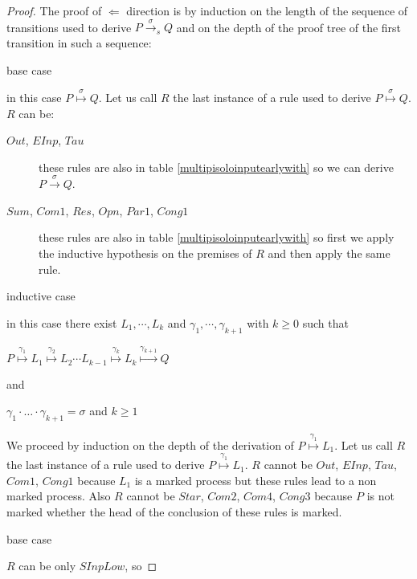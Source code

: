 \begin{proposition}
\begin{proof}
    
    The proof of $\Leftarrow$ direction is by induction on the length of the sequence of transitions used to derive $P\xrightarrow{\sigma}_{s} Q$ and on the depth of the proof tree of the first transition in such a sequence:
    \begin{description}
      \item[base case]
    \end{description}
	in this case $P\stackrel{\sigma}{\longmapsto} Q$. Let us call $R$ the last instance of a rule used to derive $P\stackrel{\sigma}{\longmapsto} Q$. $R$ can be: 
	\begin{description}
	  \item[$Out$, $EInp$, $Tau$] these rules are also in table \ref{multipisoloinputearlywith} so we can derive $P\xrightarrow{\sigma} Q$.
	  \item[$Sum$, $Com1$, $Res$, $Opn$, $Par1$, $Cong1$] these rules are also in table \ref{multipisoloinputearlywith} so first we apply the inductive hypothesis on the premises of $R$ and then apply the same rule.
	\end{description}
    \begin{description}
      \item[inductive case]
    \end{description}
	in this case there exist $L_{1}, \cdots, L_{k}$ and $\gamma_{1}, \cdots, \gamma_{k+1}$ with $k\geq 0$ such that 
	\begin{center}
	  $P \stackrel{\gamma_{1}}{\longmapsto} L_{1}  \stackrel{\gamma_{2}}{\longmapsto} L_{2} \cdots L_{k-1} \stackrel{\gamma_{k}}{\longmapsto} L_{k} \stackrel{\gamma_{k+1}}{\longmapsto} Q$ 
	\end{center}
	and 
	\begin{center}
	  $\gamma_{1} \cdot \ldots \cdot \gamma_{k+1} = \sigma$ and $k\geq 1$
	\end{center}
	We proceed by induction on the depth of the derivation of $P \stackrel{\gamma_{1}}{\longmapsto} L_{1}$. Let us call $R$ the last instance of a rule used to derive $P\stackrel{\gamma_{1}}{\longmapsto} L_{1}$. $R$ cannot be $Out$, $EInp$, $Tau$, $Com1$, $Cong1$ because $L_{1}$ is a marked process but these rules lead to a non marked process. Also $R$ cannot be $Star$, $Com2$, $Com4$, $Cong3$ because $P$ is not marked whether the head of the conclusion of these rules is marked.
	\begin{description}
	  \item[base case] 
	\end{description}
	    $R$ can be only $SInpLow$, so 

\end{proof}
\end{proposition}
